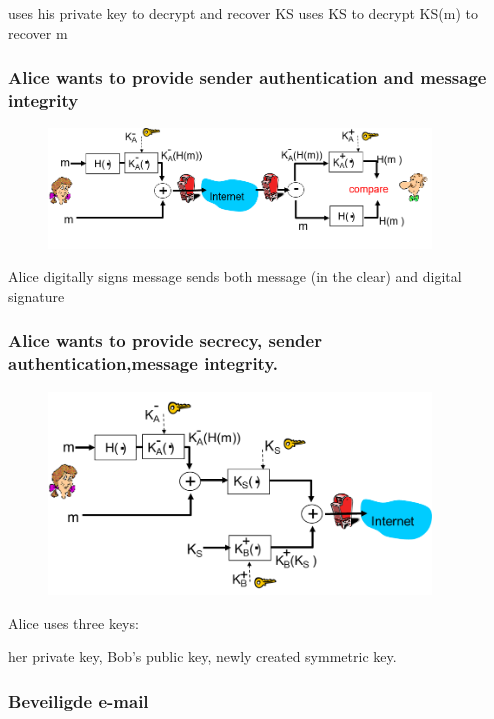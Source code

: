 \bi
\itf uses his private key to decrypt and recover KS
\itf uses KS to decrypt KS(m) to recover m
\ei

\subsubsection{Alice wants to provide sender authentication and message integrity}

\begin{figure}[h]
    \centering
    \includegraphics[width=4in]{./img/imghfdst8/hfdst8puntje24.png}
    \caption{ }      
    \label{fig: }
\end{figure}

\bi
\itf Alice digitally signs message
\itf sends both message (in the clear) and digital signature
\ei

\subsubsection{Alice wants to provide secrecy, sender authentication,message integrity.}

\begin{figure}[h]
    \centering
    \includegraphics[width=4in]{./img/imghfdst8/hfdst8puntje25.png}
    \caption{ }      
    \label{fig: }
\end{figure}

\noindent Alice uses three keys: 

\be
\itf her private key, 
\itf Bob’s public key,
\itf newly created symmetric key.
\ee
	

\clearpage

\subsubsection{Beveiligde e-mail}

